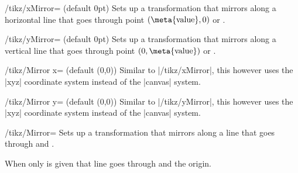 \begin{key}{/tikz/xMirror= (default 0pt)}
  Sets up a transformation that mirrors along a horizontal line that goes through point $(\text{\meta{value}}, 0)$ or .

\begin{codeexample}[preamble=\usetikzlibrary{ext.transformations.mirror}]
\end{codeexample}
\end{key}

\begin{key}{/tikz/yMirror= (default 0pt)}
  Sets up a transformation that mirrors along a vertical line that goes through point $(0, \text{\meta{value}})$ or .
\end{key}


\begin{key}{/tikz/Mirror x= (default {(0,0)})}
  Similar to |/tikz/xMirror|, this however uses the |xyz| coordinate system instead of the |canvas| system.
\begin{codeexample}[preamble=\usetikzlibrary{ext.transformations.mirror}]
\end{codeexample}
\end{key}

\begin{key}{/tikz/Mirror y= (default {(0,0)})}
  Similar to |/tikz/yMirror|, this however uses the |xyz| coordinate system instead of the |canvas| system.
\end{key}


\begin{key}{/tikz/Mirror=}
  Sets up a transformation that mirrors along a line that goes through  and .
  
  When only  is given that line goes through  and the origin.
\end{key}

\endinput